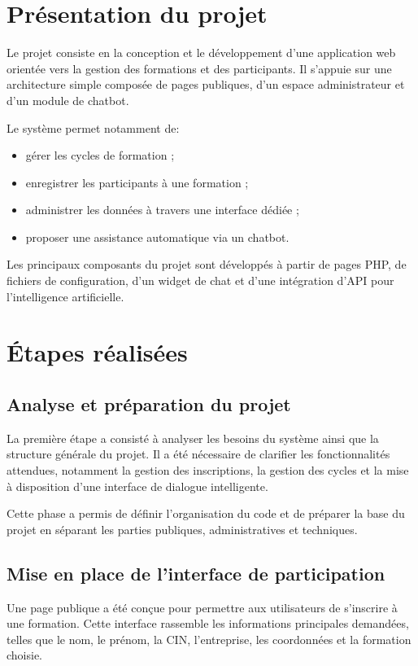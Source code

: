 \documentclass[11pt,a4paper]{report}
\begin{document}
\chapter{Présentation du projet}
Le projet consiste en la conception et le développement d’une application web orientée vers la gestion des formations et des participants. Il s’appuie sur une architecture simple composée de pages publiques, d’un espace administrateur et d’un module de chatbot.

Le système permet notamment de:
\begin{itemize}[leftmargin=1.5em]
    \item gérer les cycles de formation ;
    \item enregistrer les participants à une formation ;
    \item administrer les données à travers une interface dédiée ;
    \item proposer une assistance automatique via un chatbot.
\end{itemize}

Les principaux composants du projet sont développés à partir de pages PHP, de fichiers de configuration, d’un widget de chat et d’une intégration d’API pour l’intelligence artificielle.

\chapter{Étapes réalisées}
\section{Analyse et préparation du projet}
La première étape a consisté à analyser les besoins du système ainsi que la structure générale du projet. Il a été nécessaire de clarifier les fonctionnalités attendues, notamment la gestion des inscriptions, la gestion des cycles et la mise à disposition d’une interface de dialogue intelligente.

Cette phase a permis de définir l’organisation du code et de préparer la base du projet en séparant les parties publiques, administratives et techniques.

\section{Mise en place de l’interface de participation}
Une page publique a été conçue pour permettre aux utilisateurs de s’inscrire à une formation. Cette interface rassemble les informations principales demandées, telles que le nom, le prénom, la CIN, l’entreprise, les coordonnées et la formation choisie.
\end{document}
